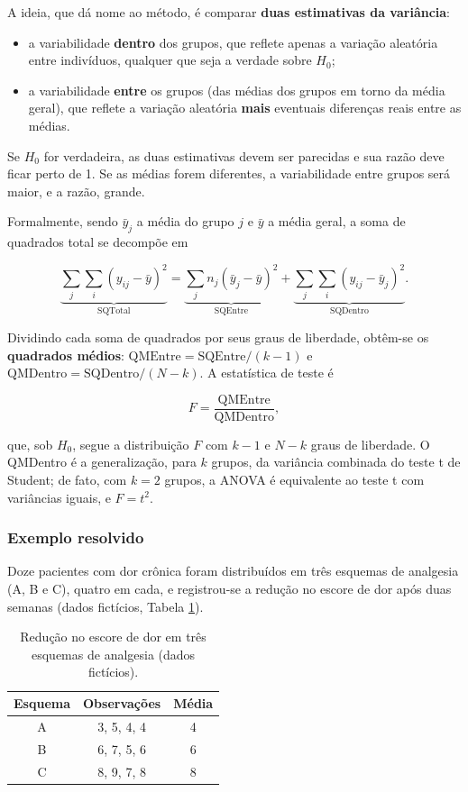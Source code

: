 \documentclass[
]{book}
\providecommand{\tightlist}{%
  \setlength{\itemsep}{0pt}\setlength{\parskip}{0pt}}
\begin{document}
A ideia, que dá nome ao método, é comparar \textbf{duas estimativas da variância}:

\begin{itemize}
\tightlist
\item
  a variabilidade \textbf{dentro} dos grupos, que reflete apenas a variação aleatória entre indivíduos, qualquer que seja a verdade sobre \(H_0\);
\item
  a variabilidade \textbf{entre} os grupos (das médias dos grupos em torno da média geral), que reflete a variação aleatória \textbf{mais} eventuais diferenças reais entre as médias.
\end{itemize}

Se \(H_0\) for verdadeira, as duas estimativas devem ser parecidas e sua razão deve ficar perto de 1. Se as médias forem diferentes, a variabilidade entre grupos será maior, e a razão, grande.

Formalmente, sendo \(\bar{y}_j\) a média do grupo \(j\) e \(\bar{y}\) a média geral, a soma de quadrados total se decompõe em

\[
\underbrace{\sum_{j}\sum_{i}(y_{ij} - \bar{y})^2}_{\text{SQTotal}} = \underbrace{\sum_{j} n_j(\bar{y}_j - \bar{y})^2}_{\text{SQEntre}} + \underbrace{\sum_{j}\sum_{i}(y_{ij} - \bar{y}_j)^2}_{\text{SQDentro}} .
\]

Dividindo cada soma de quadrados por seus graus de liberdade, obtêm-se os \textbf{quadrados médios}: \(\text{QMEntre} = \text{SQEntre}/(k - 1)\) e \(\text{QMDentro} = \text{SQDentro}/(N - k)\). A estatística de teste é

\[
F = \frac{\text{QMEntre}}{\text{QMDentro}},
\]

que, sob \(H_0\), segue a distribuição \(F\) com \(k - 1\) e \(N - k\) graus de liberdade. O QMDentro é a generalização, para \(k\) grupos, da variância combinada do teste t de Student; de fato, com \(k = 2\) grupos, a ANOVA é equivalente ao teste t com variâncias iguais, e \(F = t^2\).

\subsubsection{Exemplo resolvido}\label{exemplo-resolvido}

Doze pacientes com dor crônica foram distribuídos em três esquemas de analgesia (A, B e C), quatro em cada, e registrou-se a redução no escore de dor após duas semanas (dados fictícios, Tabela \ref{tab:an-anova-dados}).

\begin{table}

\caption{\label{tab:an-anova-dados}Redução no escore de dor em três esquemas de analgesia (dados fictícios).}
\centering
\begin{tabular}[t]{c|c|c}
\hline
Esquema & Observações & Média\\
\hline
A & 3, 5, 4, 4 & 4\\
\hline
B & 6, 7, 5, 6 & 6\\
\hline
C & 8, 9, 7, 8 & 8\\
\hline
\end{tabular}
\end{table}
\end{document}

